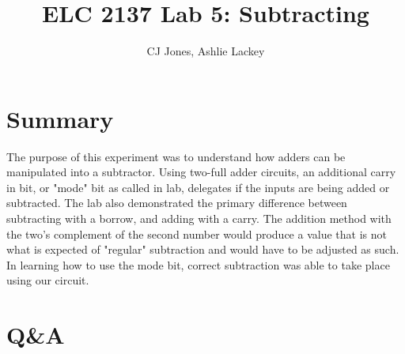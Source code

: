 \documentclass[11pt]{article}
\begin{document}
\title{ELC 2137 Lab 5: Subtracting}
\author{CJ Jones, Ashlie Lackey}

\maketitle


\section*{Summary}

The purpose of this experiment was to understand how adders can be manipulated into a subtractor. Using two-full adder circuits, an additional carry in bit, or "mode" bit as called in lab, delegates if the inputs are being added or subtracted. The lab also demonstrated the primary difference between subtracting with a borrow, and adding with a carry. The addition method with the two's complement of the second number would produce a value that is not what is expected of "regular" subtraction and would have to be adjusted as such. In learning how to use the mode bit, correct subtraction was able to take place using our circuit. 


\section*{Q\&A}
\end{document}
